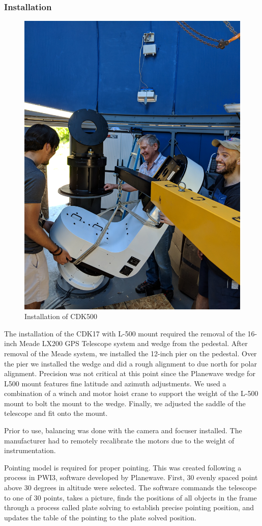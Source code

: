 \subsubsection{Installation}
\begin{figure}[h]
    \centering
    \includegraphics[width=0.5\columnwidth]{figures/cdkinstall.jpg}
    \caption{Installation of CDK500}
\label{fig:cdkinstall}
\end{figure}
The installation of the CDK17 with L-500 mount required the removal of the 16-inch Meade LX200 GPS Telescope system and wedge from the pedestal.
After removal of the Meade system, we installed the 12-inch pier on the pedestal.
Over the pier we installed the wedge and did a rough alignment to due north for polar alignment.
Precision was not critical at this point since the Planewave wedge for L500 mount features fine latitude and azimuth adjustments.
We used a combination of a winch and motor hoist crane to support the weight of the L-500 mount to bolt the mount to the wedge.
Finally, we adjusted the saddle of the telescope and fit onto the mount.

Prior to use, balancing was done with the camera and focuser installed.
The manufacturer had to remotely recalibrate the motors due to the weight of instrumentation.

Pointing model is required for proper pointing. This was created following a process in PWI3, software developed by Planewave.
First, 30 evenly spaced point above 30 degrees in altitude were selected. 
The software commands the telescope to one of 30 points, takes a picture,
finds the positions of all objects in the frame through a process called plate solving to establish precise pointing position, and
updates the table of the pointing to the plate solved position.

